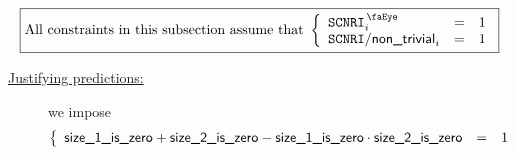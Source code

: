 

\[
	\boxed{\text{All constraints in this subsection assume that }
	\left\{ \begin{array}{lcl}
		\isMxpScenario                     _{i} & = & 1 \\
	    \locMxpScenarioNonTrivialOperation _{i} & = & 1 \\
	\end{array} \right. }
\]

\begin{description}
	\item[\underline{Justifying \hubMod{} predictions:}] 
		we impose
		\[
			\left\{ \begin{array}{lcl}
				\textsf{size\_1\_is\_zero} + \textsf{size\_2\_is\_zero} - \textsf{size\_1\_is\_zero} \cdot \textsf{size\_2\_is\_zero} & = & 1 \\
			\end{array} \right.
		\]
\end{description}